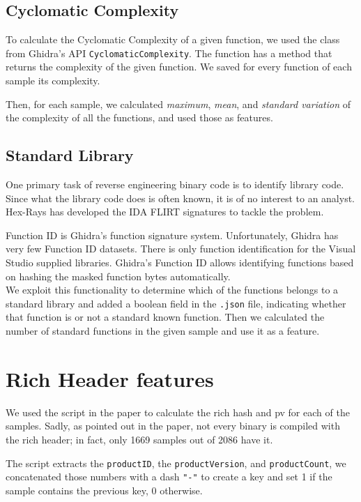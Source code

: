 \subsection{Cyclomatic Complexity}

To calculate the Cyclomatic Complexity of a given function, we used the class from Ghidra's API \texttt{CyclomaticComplexity}. The function has a method that returns the complexity of the given function. We saved for every function of each sample its complexity. 

Then, for each sample, we calculated \textit{maximum}, \textit{mean}, and \textit{standard variation} of the complexity of all the functions, and used those as features.

\subsection{Standard Library}

One primary task of reverse engineering binary code is to identify library code. Since what the library code does is often known, it is of no interest to an analyst. Hex-Rays has developed the IDA FLIRT signatures to tackle the problem. 

Function ID is Ghidra's function signature system. Unfortunately, Ghidra has very few Function ID datasets. There is only function identification for the Visual Studio supplied libraries. Ghidra's Function ID allows identifying functions based on hashing the masked function bytes automatically.\cite{ghidra_fid}\\

We exploit this functionality to determine which of the functions belongs to a standard library and added a boolean field in the \texttt{.json} file, indicating whether that function is or not a standard known function. Then we calculated the number of standard functions in the given sample and use it as a feature.

\section{Rich Header features}
We used the script in the paper \cite{dubyk2019sans} to calculate the rich hash and pv for each of the samples. Sadly, as pointed out in the paper, not every binary is compiled with the rich header; in fact, only 1669 samples out of 2086 have it. 

The script extracts the \texttt{productID}, the \texttt{productVersion}, and \texttt{productCount}, we concatenated those numbers with a dash \texttt{"-"} to create a key and set 1 if the sample contains the previous key, 0 otherwise.

